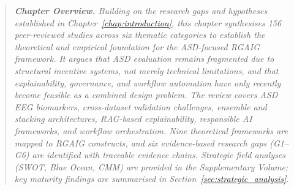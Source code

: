\label{fig:ch2_theory_consolidated}
\label{fig:cmm_radar_orig}
\label{fig:kpi_gap}
\label{fig:prisma_bar}
\label{fig:theory_integration}
\label{sec:kpi_mapping}
\label{sec:strategic_analysis}
\label{tab:ai_dimensions_taxonomy}
\label{tab:asd_top_studies}
\label{tab:cancer_method_accuracy}
\label{tab:ch2_alignment}
\label{tab:ch2_non_claims}
\label{tab:clinician_adoption_barriers}
\label{tab:contradictory_evidence}
\label{tab:critical_weaknesses}
\label{tab:cross_dataset_penalty}
\label{tab:diagnostic_methods}
\label{tab:gap_contribution_link}
\label{tab:hypothesis_model_mapping}
\label{tab:hypothesis_reconciliation}
\label{tab:key_studies}
\label{tab:literature_streams}
\label{tab:lit_ethical}
\label{tab:lit_kpi_mapping}
\label{tab:lit_pipeline_alignment}
\label{tab:meta_gaps}
\label{tab:mgmt_theme_synthesis}
\label{tab:pd_modality_comparison}
\label{tab:porters_forces}
\label{tab:practitioner_gap}
\label{tab:rag_clinical_applications}
\label{tab:reproducibility_factors}
\label{tab:reproducibility_indicators}
\label{tab:research_direction_justification}
\label{tab:research_gaps}
\label{tab:rgaig_dimension_coverage}
\label{tab:rq_lit_themes}
\label{tab:rtai_layers}
\label{tab:search_strategy}
\label{tab:six_key_findings}
\label{tab:strategic_analysis_summary}
\label{tab:strengths_limitations}
\label{tab:theory_construct_mapping}
\label{tab:transfer_learning_gains}
\label{tab:trust_framework}
\label{tab:validation_strategy_usage}
\label{tab:who_prevalence}
\label{tab:xai_comparison}

\vspace{0.3em}
\noindent\begin{quote}\itshape\small
\textbf{\color{currentaccent}Chapter Overview.}
Building on the research gaps and hypotheses established in Chapter~\ref{chap:introduction}, this chapter synthesises 156 peer-reviewed studies across six thematic categories to establish the theoretical and empirical foundation for the ASD-focused RGAIG framework.
It argues that ASD evaluation remains fragmented due to structural incentive systems, not merely technical limitations, and that explainability, governance, and workflow automation have only recently become feasible as a combined design problem.
The review covers ASD EEG biomarkers, cross-dataset validation challenges, ensemble and stacking architectures, RAG-based explainability, responsible AI frameworks, and workflow orchestration.
Nine theoretical frameworks are mapped to RGAIG constructs, and six evidence-based research gaps (G1--G6) are identified with traceable evidence chains.
Strategic field analyses (SWOT, Blue Ocean, CMM) are provided in the Supplementary Volume; key maturity findings are summarised in Section~\ref{sec:strategic_analysis}.
\end{quote}
\vspace{0.3em}

